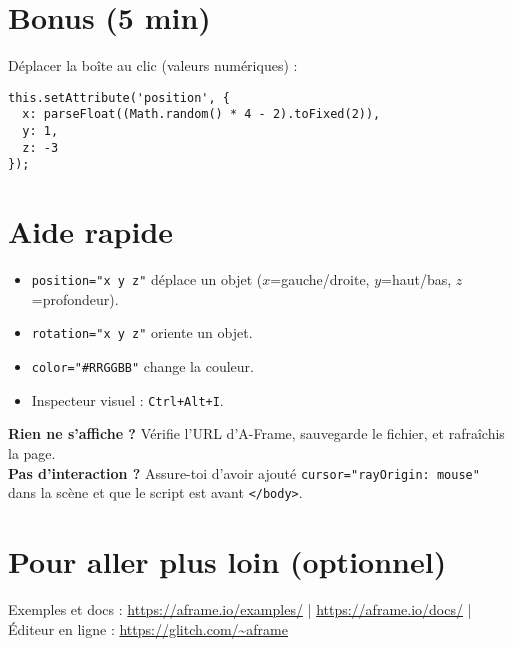 \documentclass[12pt]{article}
\begin{document}
\section*{Bonus (5 min)}
Déplacer la boîte au clic (valeurs numériques) :

\begin{verbatim}
this.setAttribute('position', {
  x: parseFloat((Math.random() * 4 - 2).toFixed(2)),
  y: 1,
  z: -3
});
\end{verbatim}

\section*{Aide rapide}
\begin{itemize}
  \item \texttt{position="x y z"} déplace un objet (\(x\)=gauche/droite, \(y\)=haut/bas, \(z\)=profondeur).
  \item \texttt{rotation="x y z"} oriente un objet.
  \item \texttt{color="\#RRGGBB"} change la couleur.
  \item Inspecteur visuel : \texttt{Ctrl+Alt+I}.
\end{itemize}

\begin{helpbox}
\textbf{Rien ne s'affiche ?} Vérifie l'URL d'A-Frame, sauvegarde le fichier, et rafraîchis la page.\\
\textbf{Pas d'interaction ?} Assure-toi d'avoir ajouté \texttt{cursor="rayOrigin: mouse"} dans la scène et que le script est avant \texttt{</body>}.
\end{helpbox}

\section*{Pour aller plus loin (optionnel)}
Exemples et docs : \url{https://aframe.io/examples/} \;|\; \url{https://aframe.io/docs/} \;|\; Éditeur en ligne : \url{https://glitch.com/~aframe}
\end{document}

